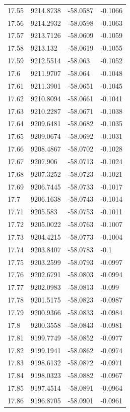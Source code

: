 \begin{table}[H]
\begin{tabular}{llll}
17.55 & 9214.8738 & -58.0587 & -0.1066 \\
17.56 & 9214.2932 & -58.0598 & -0.1063 \\
17.57 & 9213.7126 & -58.0609 & -0.1059 \\
17.58 & 9213.132 & -58.0619 & -0.1055 \\
17.59 & 9212.5514 & -58.063 & -0.1052 \\
17.6 & 9211.9707 & -58.064 & -0.1048 \\
17.61 & 9211.3901 & -58.0651 & -0.1045 \\
17.62 & 9210.8094 & -58.0661 & -0.1041 \\
17.63 & 9210.2287 & -58.0671 & -0.1038 \\
17.64 & 9209.6481 & -58.0682 & -0.1035 \\
17.65 & 9209.0674 & -58.0692 & -0.1031 \\
17.66 & 9208.4867 & -58.0702 & -0.1028 \\
17.67 & 9207.906 & -58.0713 & -0.1024 \\
17.68 & 9207.3252 & -58.0723 & -0.1021 \\
17.69 & 9206.7445 & -58.0733 & -0.1017 \\
17.7 & 9206.1638 & -58.0743 & -0.1014 \\
17.71 & 9205.583 & -58.0753 & -0.1011 \\
17.72 & 9205.0022 & -58.0763 & -0.1007 \\
17.73 & 9204.4215 & -58.0773 & -0.1004 \\
17.74 & 9203.8407 & -58.0783 & -0.1 \\
17.75 & 9203.2599 & -58.0793 & -0.0997 \\
17.76 & 9202.6791 & -58.0803 & -0.0994 \\
17.77 & 9202.0983 & -58.0813 & -0.099 \\
17.78 & 9201.5175 & -58.0823 & -0.0987 \\
17.79 & 9200.9366 & -58.0833 & -0.0984 \\
17.8 & 9200.3558 & -58.0843 & -0.0981 \\
17.81 & 9199.7749 & -58.0852 & -0.0977 \\
17.82 & 9199.1941 & -58.0862 & -0.0974 \\
17.83 & 9198.6132 & -58.0872 & -0.0971 \\
17.84 & 9198.0323 & -58.0882 & -0.0967 \\
17.85 & 9197.4514 & -58.0891 & -0.0964 \\
17.86 & 9196.8705 & -58.0901 & -0.0961 \\

\end{tabular}
\end{table}
